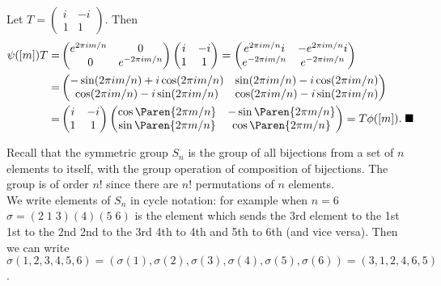 \documentclass[../Project.tex]{subfiles}
\begin{document}
\begin{proo*}[\cite{1}]
	Let $T = \begin{pmatrix}i & -i\\1 & 1\end{pmatrix}$. Then
\begin{align*}	
	\psi([m])T = &\begin{pmatrix}e^{2 \pi i m/n} & 0 \\\ 0 & e^{-2 \pi i m/n}\end{pmatrix} \begin{pmatrix}i & -i\\1 & 1\end{pmatrix} = \begin{pmatrix}e^{2 \pi i m/n}i & -e^{2 \pi i m/n}i \\ e^{-2 \pi i m/n} & e^{-2 \pi i m/n}\end{pmatrix}\\ = &\begin{pmatrix}-\sin(2\pi i m/n) + i\cos(2\pi i m/n) & \sin(2\pi i m/n) - i\cos(2\pi i m/n)\\ \cos(2\pi i m/n) - i \sin(2\pi i m/n) & \cos(2\pi i m/n) - i \sin(2\pi i m/n)\end{pmatrix}\\
	= & \begin{pmatrix}i & -i\\1 & 1\end{pmatrix}\begin{pmatrix}\cos\Paren{{2 \pi m}/{n}} & -\sin\Paren{{2 \pi m}/{n}}\\ \sin\Paren{{2 \pi m}/{n}} & \cos\Paren{{2 \pi m}/{n}}\end{pmatrix} =  T\phi([m]). \;\blacksquare
\end{align*}
\end{proo*}


\begin{defi}
	Recall that the symmetric group $S_n$ is the group of all bijections from a set of $n$ elements to itself, with the group operation of composition of bijections. The group is of order $n!$ since there are $n!$ permutations of $n$ elements.\\

	We write elements of $S_n$ in cycle notation: for example when $n=6$\; $\sigma = (2\;1\;3)(4)(5\;6)$ is the element which sends the $3$rd element to the 1st\; 1st to the 2nd\; 2nd to the 3rd\; 4th to 4th\; and 5th to 6th (and vice versa). Then we can write
	$\sigma(1,2,3,4,5,6) = (\sigma(1),\sigma(2),\sigma(3),\sigma(4),\sigma(5),\sigma(6)) = (3,1,2,4,6,5)$.
\end{defi}
\end{document}
